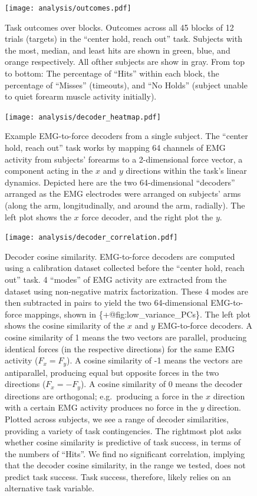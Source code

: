 \documentclass[../main.tex]{subfiles}
\begin{document}
\begin{figure}
\centering
\texttt{[image: analysis/outcomes.pdf]}
\caption{Task outcomes over blocks. Outcomes across all 45 blocks of 12
trials (targets) in the ``center hold, reach out'' task. Subjects with
the most, median, and least hits are shown in green, blue, and orange
respectively. All ofther subjects are show in gray. From top to bottom:
The percentage of ``Hits'' within each block, the percentage of
``Misses'' (timeouts), and ``No Holds'' (subject unable to quiet forearm
muscle activity initially).}\label{fig:outcomes}
\end{figure}

\begin{figure}
\centering
\texttt{[image: analysis/decoder\_heatmap.pdf]}
\caption{Example EMG-to-force decoders from a single subject. The
``center hold, reach out'' task works by mapping 64 channels of EMG
activity from subjects' forearms to a 2-dimensional force vector, a
component acting in the \(x\) and \(y\) directions within the task's
linear dynamics. Depicted here are the two 64-dimensional ``decoders''
arranged as the EMG electrodes were arranged on subjects' arms (along
the arm, longitudinally, and around the arm, radially). The left plot
shows the \(x\) force decoder, and the right plot the
\(y\).}\label{fig:decoders}
\end{figure}

\begin{figure}
\centering
\texttt{[image: analysis/decoder\_correlation.pdf]}
\caption{Decoder cosine similarity. EMG-to-force decoders are computed
using a calibration dataset collected before the ``center hold, reach
out'' task. 4 ``modes'' of EMG activity are extracted from the dataset
using non-negative matrix factorization. These 4 modes are then
subtracted in pairs to yield the two 64-dimensional EMG-to-force
mappings, shown in \{+@fig:low\_variance\_PCs\}. The left plot shows the
cosine similarity of the \(x\) and \(y\) EMG-to-force decoders. A cosine
similarity of 1 means the two vectors are parallel, producing identical
forces (in the respective directions) for the same EMG activity
(\(F_x = F_y\)). A cosine similarity of -1 means the vectors are
antiparallel, producing equal but opposite forces in the two directions
(\(F_x = -F_y\)). A cosine similarity of 0 means the decoder directions
are orthogonal; e.g.~producing a force in the \(x\) direction with a
certain EMG activity produces no force in the \(y\) direction. Plotted
across subjects, we see a range of decoder similarities, providing a
variety of task contingencies. The rightmost plot asks whether cosine
similarity is predictive of task success, in terms of the numbers of
``Hits''. We find no significant correlation, implying that the decoder
cosine similarity, in the range we tested, does not predict task
success. Task success, therefore, likely relies on an alternative task
variable.}\label{fig:decoder_correlations}
\end{figure}
\end{document}
